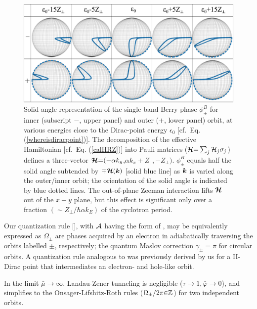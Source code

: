 \documentclass[aps, showpacs, twocolumn, notitlepage, superscriptaddress]{revtex4-1}
\begin{document}
\begin{figure}
\includegraphics[width=1.0\columnwidth]{blochsphere.png}
\caption{Solid-angle representation of  the single-band Berry phase $\phi_{\pm}^B$ for inner (subscript $-$, upper panel) and outer ($+$, lower panel) orbit, at various energies close to the Dirac-point energy $\epsilon_0$ [cf.\ Eq. (\ref{whereisdiracpoint})]. The decomposition of the effective Hamiltonian [cf.\ Eq. (\ref{calHRZ})] into  Pauli matrices (${\cal H}{=}\sum_j{\cal H}_j\sigma_j$) defines a three-vector $\boldsymbol{{\cal H}}{=}({-}\alpha k_y$,$\alpha k_x{+}Z_\parallel,{-}Z_\perp)$. $\phi_{\pm}^B$ equals half the solid angle subtended by   ${\mp} \boldsymbol{{\cal H}}(\boldsymbol{k})$ [solid blue line] as $\boldsymbol{k}$ is varied along the outer/inner orbit\cite{berry_quantal_1984}; the orientation of the solid angle is indicated by blue dotted lines. The out-of-plane Zeeman interaction lifts $\boldsymbol{{\cal H}}$ out of the $x-y$ plane, but this effect is significant only over a fraction $(\sim Z_{\perp}/\hbar \alpha k_E)$  of the cyclotron period.
\label{fig:blochsphere}}
\end{figure}

Our quantization rule [], with ${\cal A}$ having the form of , may be equivalently expressed as
$\Omega_{\pm}$ are phases acquired by an electron in adiabatically traversing the orbits labelled $\pm$, respectively; the quantum Maslov correction $\gamma_{\pm}{=}\pi$ for circular orbits.  A quantization rule analogous to  was previously derived by us for a II-Dirac point that intermediates an electron- and hole-like orbit\cite{AALG}. 

In the limit $\bar{\mu}{\rightarrow} \infty$, Landau-Zener tunneling is negligible ($\tau{\rightarrow}1,\bar{\varphi}{\rightarrow}0$), and  simplifies to the Onsager-Lifshitz-Roth rules ($\Omega_{\pm}/2\pi{\in}\mathbb{Z}$) for two independent orbits.
\end{document}
